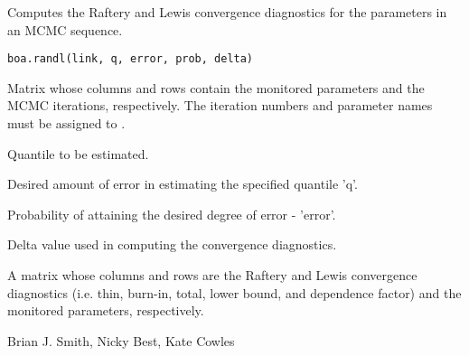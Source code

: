 \begin{Description}\relax
Computes the Raftery and Lewis convergence diagnostics for the parameters in 
an MCMC sequence.
\end{Description}
\begin{Usage}
\begin{verbatim}
boa.randl(link, q, error, prob, delta)
\end{verbatim}
\end{Usage}
\begin{Arguments}
\begin{ldescription}
\item[\code{link}] Matrix whose columns and rows contain the monitored parameters 
and the MCMC iterations, respectively. The iteration numbers and parameter 
names must be assigned to .
\item[\code{q}] Quantile to be estimated.
\item[\code{error}] Desired amount of error in estimating the specified quantile 'q'.
\item[\code{prob}] Probability of attaining the desired degree of error - 'error'.
\item[\code{delta}] Delta value used in computing the convergence diagnostics.
\end{ldescription}
\end{Arguments}
\begin{Value}
A matrix whose columns and rows are the Raftery and Lewis convergence diagnostics 
(i.e. thin, burn-in, total, lower bound, and dependence factor) and the monitored 
parameters, respectively.
\end{Value}
\begin{Author}\relax
Brian J. Smith, Nicky Best, Kate Cowles
\end{Author}
\begin{References}\relax
{}
\end{References}
\begin{SeeAlso}\relax
{}
\end{SeeAlso}

